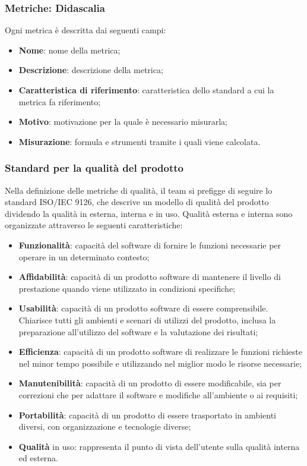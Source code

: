 \documentclass[10pt, a4paper]{article}
\begin{document}
\subsubsection{Metriche: Didascalia}
Ogni metrica è descritta dai seguenti campi:
\begin{itemize}
    \item \textbf{Nome}: nome della metrica;
    \item \textbf{Descrizione}: descrizione della metrica;
    \item \textbf{Caratteristica di riferimento}: caratteristica dello standard a cui la metrica fa riferimento;
    \item \textbf{Motivo}: motivazione per la quale è necessario misurarla;
    \item \textbf{Misurazione}: formula e strumenti tramite i quali viene calcolata.
\end{itemize}

\subsubsection{Standard per la qualità del prodotto}
Nella definizione delle metriche di qualità, il team si prefigge di seguire lo standard ISO/IEC 9126, che descrive un modello di qualità del prodotto
dividendo la qualità in esterna, interna e in uso.
Qualità esterna e interna sono organizzate attraverso le seguenti caratteristiche:
\begin{itemize}
    \item \textbf{Funzionalità}: capacità del software di fornire le funzioni necessarie per operare in un determinato contesto;
    \item \textbf{Affidabilità}: capacità di un prodotto software di mantenere il livello di prestazione quando viene utilizzato in condizioni specifiche;
    \item \textbf{Usabilità}: capacità di un prodotto software di essere comprensibile. Chiarisce tutti gli ambienti e scenari di utilizzi del prodotto, 
        inclusa la preparazione all'utilizzo del software e la valutazione dei risultati;
    \item \textbf{Efficienza}: capacità di un prodotto software di realizzare le funzioni richieste nel minor tempo possibile e utilizzando nel miglior modo le risorse necessarie;
    \item \textbf{Manutenibilità}: capacità di un prodotto di essere modificabile, sia per correzioni che per adattare il software e modifiche all'ambiente o ai requisiti;
    \item \textbf{Portabilità}: capacità di un prodotto di essere trasportato in ambienti diversi, con organizzazione e tecnologie diverse;
    \item \textbf{Qualità} in uso: rappresenta il punto di vista dell'utente sulla qualità interna ed esterna. 
\end{itemize}
\end{document}
